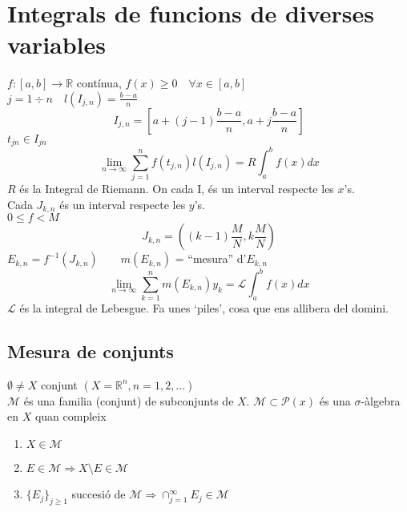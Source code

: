 \documentclass{article}
\newcommand{\R}{\mathbb{R}}
\newcommand{\LL}{\mathcal{L}}
\newcommand{\M}{\mathcal{M}}
\newcommand{\PP}{\mathcal{P}}
\begin{document}
\section{Integrals de funcions de diverses variables}
$f:[a,b] \to \R$ contínua, $f(x) \geq 0\quad \forall x \in [a, b]$\\
$j=1\div n\quad l(I_{j,n}) = \frac{b-a}{n}$ %
$$I_{j,n} = \left[a + (j-1) \frac{b-a}{n}, a + j \frac{b-a}{n}\right]$$
$t_{jn} \in I_{jn}$
$$\lim_{n\to\infty} \sum_{j=1}^n f(t_{j,n}) l(I_{j,n}) = R \int_a^bf(x) dx$$
$R$ és la Integral de Riemann. On cada I, és un interval respecte les $x$'s.\\

Cada $J_{k,n}$ és un interval respecte les $y$'s.\\
$0 \leq f < M$
$$J_{k,n} = \left((k-1)\frac{M}{N}, k\frac{M}{N}\right)$$
$E_{k,n} = f^{-1}(J_{k,n})\qquad m(E_{k,n})$ = ``mesura'' d'$E_{k,n}$
$$\lim_{n\to\infty}\sum_{k=1}^nm(E_{k,n})y_k = \LL\int_a^b f(x) dx$$
$\LL$ és la integral de Lebesgue. Fa unes `piles', cosa que ens allibera del domini.

\subsection{Mesura de conjunts}
$\emptyset \neq X$ conjunt $(X = \R^n, n=1,2,\ldots)$\\
$\M$ és una familia (conjunt) de subconjunts de $X$. $\M \subset \PP(x)$ és una $\sigma$-àlgebra en $X$ quan compleix
\begin{enumerate}
\item $X \in \M$
\item $E \in \M \Rightarrow X\setminus E \in \M$
\item $\{E_j\}_{j\geq1}$ succesió de $\M \Rightarrow \cap_{j=1}^\infty E_j \in \M$
\end{enumerate}
\end{document}

